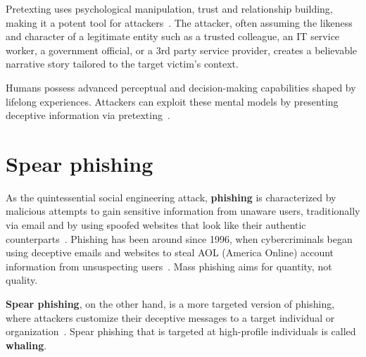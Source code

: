 Pretexting uses psychological manipulation, trust and relationship building, making it a potent tool for attackers~\citep{mitnick_The_Art_of_Deception_2003}. The attacker, often assuming the likeness and character of a legitimate entity such as a trusted colleague, an IT service worker, a government official, or a 3rd party service provider, creates a believable narrative story tailored to the target victim's context.

Humans possess advanced perceptual and decision-making capabilities shaped by lifelong experiences. Attackers can exploit these mental models by presenting deceptive information via pretexting~\citep{mirsky_Threat_Offensive_AI_Organizations_2023}.







\section{Spear phishing}
\begin{comment}

What to cover:
    - What is phishing (via email and ALSO other means)
    - Spear phishing a more targeted form of phishing
    - Whaling
    
\end{comment}


%
%
As the quintessential social engineering attack, \textbf{phishing} is characterized by malicious attempts to gain sensitive information from unaware users, traditionally via email and by using spoofed websites that look like their authentic counterparts~\citep{basit_Comprehensive_Survey_AI_Phishing_Detection_2021}. Phishing has been around since 1996, when cybercriminals began using deceptive emails and websites to steal AOL (America Online) account information from unsuspecting users~\citep{wang_Defining_Social_Engineering_2020}. Mass phishing aims for quantity, not quality.



%
%
\textbf{Spear phishing}, on the other hand, is a more targeted version of phishing, where attackers customize their deceptive messages to a target individual or organization~\citep{fakhouri_AI_Driven_Solutions_SE_Attacks_2024}. Spear phishing that is targeted at high-profile individuals is called \textbf{whaling}.


